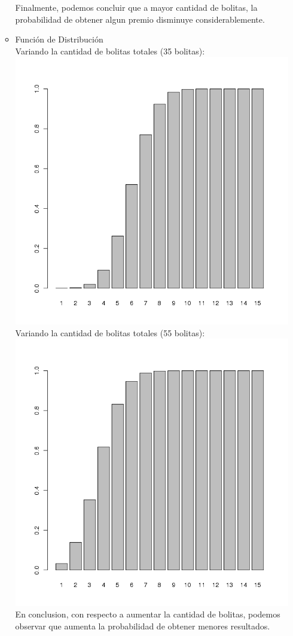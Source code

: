 \begin{itemize}
\begin{itemize}
		Finalmente, podemos concluir que a mayor cantidad de bolitas, la probabilidad de obtener algun premio disminuye considerablemente.\\
		\item Funci\'on de Distribuci\'on\\
			Variando la cantidad de bolitas totales (35 bolitas):\\
		\includegraphics[scale=0.5]{images/1_5-phyper-variado1}\\
			Variando la cantidad de bolitas totales (55 bolitas):\\
		\includegraphics[scale=0.5]{images/1_5-phyper-variado2}\\
		En conclusion, con respecto a aumentar la cantidad de bolitas, podemos observar que aumenta la probabilidad de obtener menores resultados.\\
	\end{itemize}

\end{itemize}
